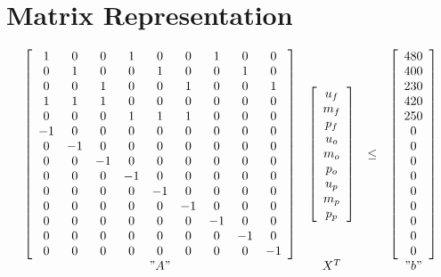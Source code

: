 \documentclass{article}
\begin{document}
\section*{Matrix Representation}

\[
\begin{array}{cccc}
\left[ \begin{array}{ccccccccc}
1 & 0 & 0 & 1 & 0 & 0 & 1 & 0 & 0\\
0 & 1 & 0 & 0 & 1 & 0 & 0 & 1 & 0\\
0 & 0 & 1 & 0 & 0 & 1 & 0 & 0 & 1\\
1 & 1 & 1 & 0 & 0 & 0 & 0 & 0 & 0\\
0 & 0 & 0 & 1 & 1 & 1 & 0 & 0 & 0\\
-1 & 0 & 0 & 0 & 0 & 0 & 0 & 0 & 0\\
0 & -1 & 0 & 0 & 0 & 0 & 0 & 0 & 0\\
0 & 0 & -1 & 0 & 0 & 0 & 0 & 0 & 0\\
0 & 0 & 0 & -1 & 0 & 0 & 0 & 0 & 0\\
0 & 0 & 0 & 0 & -1 & 0 & 0 & 0 & 0\\
0 & 0 & 0 & 0 & 0 & -1 & 0 & 0 & 0\\
0 & 0 & 0 & 0 & 0 & 0 & -1 & 0 & 0\\
0 & 0 & 0 & 0 & 0 & 0 & 0 & -1 & 0\\
0 & 0 & 0 & 0 & 0 & 0 & 0 & 0 & -1\\
\end{array} \right]
&
\left[ \begin{array}{c}
u_f\\
m_f\\
p_f\\
u_o\\
m_o\\
p_o\\
u_p\\
m_p\\
p_p 
\end{array} \right]
&
\leq
&
\left[ \begin{array}{c}
480\\
400\\
230\\
420\\
250\\
0\\
0\\
0\\
0\\
0\\
0\\
0\\
0\\
0 \end{array} \right]
\\
"A" & X^T & & "b"
\end{array}
\]
\end{document}
